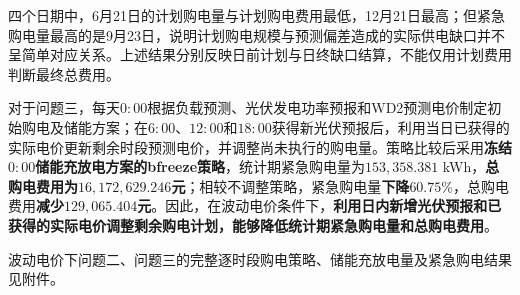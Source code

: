 四个日期中，6月21日的计划购电量与计划购电费用最低，12月21日最高；但紧急购电量最高的是9月23日，说明计划购电规模与预测偏差造成的实际供电缺口并不呈简单对应关系。上述结果分别反映日前计划与日终缺口结算，不能仅用计划费用判断最终总费用。

对于问题三，每天$0{:}00$根据负载预测、光伏发电功率预报和WD2预测电价制定初始购电及储能方案；在$6{:}00$、$12{:}00$和$18{:}00$获得新光伏预报后，利用当日已获得的实际电价更新剩余时段预测电价，并调整尚未执行的购电量。策略比较后采用\textbf{冻结$0{:}00$储能充放电方案的bfreeze策略}，统计期紧急购电量为$153,358.381$ kWh，\textbf{总购电费用为$16,172,629.246$元}；相较不调整策略，紧急购电量\textbf{下降$60.75\%$}，总购电费用\textbf{减少$129,065.404$元}。因此，在波动电价条件下，\textbf{利用日内新增光伏预报和已获得的实际电价调整剩余购电计划，能够降低统计期紧急购电量和总购电费用}。

波动电价下问题二、问题三的完整逐时段购电策略、储能充放电量及紧急购电结果见附件。